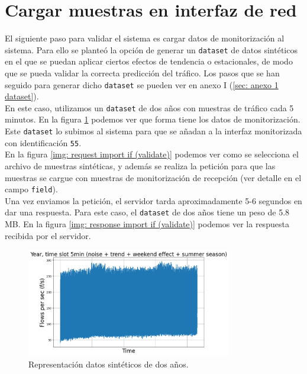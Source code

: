 \documentclass[a4paper, oneside, 12pt]{book}
\begin{document}
	\section{Cargar muestras en interfaz de red}
	\label{sec: load data if}
	
	\noindent El siguiente paso para validar el sistema es cargar datos de monitorización al sistema. Para ello se planteó la opción de generar un \texttt{dataset} de datos sintéticos en el que se puedan aplicar ciertos efectos de tendencia o estacionales, de modo que se pueda validar la correcta predicción del tráfico. Los pasos que se han seguido para generar dicho \texttt{dataset} se pueden ver en anexo I (\ref{sec: anexo 1 dataset}). \\
	
	\noindent En este caso, utilizamos un \texttt{dataset} de dos años con muestras de tráfico cada 5 minutos. En la figura \ref{img: synthetic dataset two year} podemos ver que forma tiene los datos de monitorización. Este \texttt{dataset} lo subimos al sistema para que se añadan a la interfaz monitorizada con identificación \texttt{55}. \\
	
	\noindent En la figura \ref{img: request import if (validate)} podemos ver como se selecciona el archivo de muestras sintéticas, y además se realiza la petición para que las muestras se cargue con muestras de monitorización de recepción (ver detalle en el campo \texttt{field}). \\
	
	\noindent Una vez enviamos la petición, el servidor tarda aproximadamente 5-6 segundos en dar una respuesta. Para este caso, el \texttt{dataset} de dos años tiene un peso de 5.8 MB. En la figura \ref{img: response import if (validate)} podemos ver la respuesta recibida por el servidor. \\
	
	\pagebreak
	
	\begin{figure}[h!]
		\begin{center}
			\includegraphics[width=0.8\textwidth]{img/dataset_synt_1.png}
			\caption{Representación datos sintéticos de dos años.}
			\label{img: synthetic dataset two year}
		\end{center}
	\end{figure}
	
\end{document}
